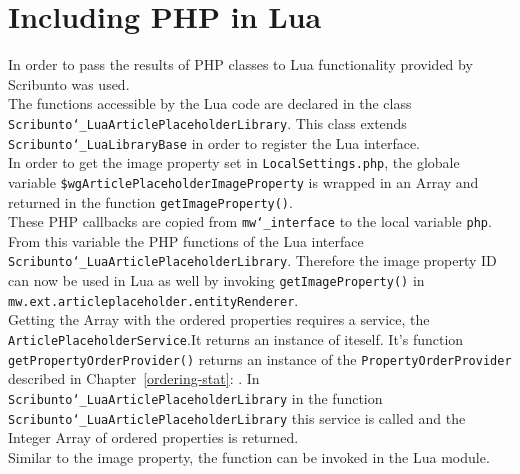 \section{Including PHP in Lua}\label{including-lua}


In order to pass the results of PHP classes to Lua functionality provided by Scribunto was used. \\
The functions accessible by the Lua code are declared in the class \texttt{Scribunto\char`_LuaArticlePlaceholderLibrary}. This class extends \texttt{Scribunto\char`_LuaLibraryBase} in order to register the Lua interface. \\
In order to get the image property set in \texttt{LocalSettings.php}, the globale variable \texttt{\$wgArticlePlaceholderImageProperty} is wrapped in an Array and returned in the function \texttt{getImageProperty()}. \\
These PHP callbacks are copied from \texttt{mw\char`_interface} to the local variable \texttt{php}. From this variable the PHP functions of the Lua interface \texttt{Scribunto\char`_LuaArticlePlaceholderLibrary}. Therefore the image property ID can now be used in Lua as well by invoking \texttt{getImageProperty()} in \texttt{mw.ext.articleplaceholder.entityRenderer}. \\
Getting the Array with the ordered properties requires a service, the \texttt{ArticlePlaceholderService}.It returns an instance of iteself. It's function \texttt{getPropertyOrderProvider()} returns an instance of the \texttt{PropertyOrderProvider} described in Chapter~\ref{ordering-stat}: .
In \texttt{Scribunto\char`_LuaArticlePlaceholderLibrary} in the function \texttt{Scribunto\char`_LuaArticlePlaceholderLibrary} this service is called and the Integer Array of ordered properties is returned.\\
Similar to the image property, the function can be invoked in the Lua module.

